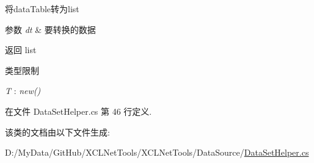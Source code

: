 将data\+Table转为list 


\begin{DoxyParams}{参数}
{\em dt} & 要转换的数据\\
\hline
\end{DoxyParams}
\begin{DoxyReturn}{返回}
list
\end{DoxyReturn}
\begin{Desc}
\item[类型限制]\begin{description}
\item[{\em T} : {\em new()}]\end{description}
\end{Desc}


在文件 Data\+Set\+Helper.\+cs 第 46 行定义.



该类的文档由以下文件生成\+:\begin{DoxyCompactItemize}
\item 
D\+:/\+My\+Data/\+Git\+Hub/\+X\+C\+L\+Net\+Tools/\+X\+C\+L\+Net\+Tools/\+Data\+Source/\hyperlink{_data_set_helper_8cs}{Data\+Set\+Helper.\+cs}\end{DoxyCompactItemize}
